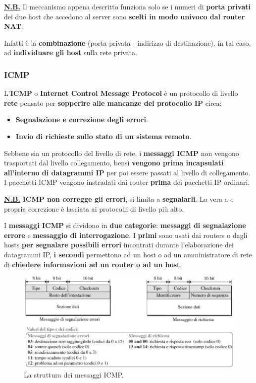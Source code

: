 \documentclass[11pt,a4paper,oneside]{book}
\theoremstyle{definition}
\begin{document}
\textbf{\underline{N.B.}} Il meccanismo appena descritto funziona solo se i numeri di \textbf{porta privati} dei due host che accedono al server sono \textbf{scelti in modo univoco dal router NAT}.

Infatti è la \textbf{combinazione} (porta privata - indirizzo di destinazione), in tal caso, ad \textbf{individuare gli host} sulla rete privata.

\pagebreak

\subsubsection{ICMP}
L'\textbf{ICMP} o \textbf{Internet Control Message Protocol} è un protocollo di livello \textbf{rete} pensato per \textbf{sopperire alle mancanze del protocollo IP} circa:

\begin{itemize}
	\item \textbf{Segnalazione e correzione degli errori}.
	\item \textbf{Invio di richieste sullo stato di un sistema remoto}.
\end{itemize}

Sebbene sia un protocollo del livello di rete, i \textbf{messaggi ICMP} non vengono trasportati dal livello collegamento, bensì \textbf{vengono prima incapsulati all'interno di datagrammi IP} per poi essere passati al livello di collegamento. I pacchetti ICMP vengono instradati dai router \textbf{prima} dei pacchetti IP ordinari.

\textbf{\underline{N.B.}} \textbf{ICMP non corregge gli errori}, si limita a \textbf{segnalarli}. La vera a e propria correzione è lasciata ai protocolli di livello più alto.

I \textbf{messaggi ICMP} si dividono in \textbf{due categorie}: \textbf{messaggi di segnalazione errore} e \textbf{messaggio di interrogazione}. I \textbf{primi} sono usati dai routers o dagli hosts \textbf{per segnalare possibili errori} incontrati durante l'elaborazione dei datagrammi IP, \textbf{i secondi} permettono ad un host o ad un amministratore di rete di \textbf{chiedere informazioni ad un router o ad un host}.

\begin{figure}[!h]
	\includegraphics[scale=1.3]{Immagini/ICMP.png}
	\centering
	\caption{La struttura dei messaggi ICMP.}
\end{figure}
\end{document}
